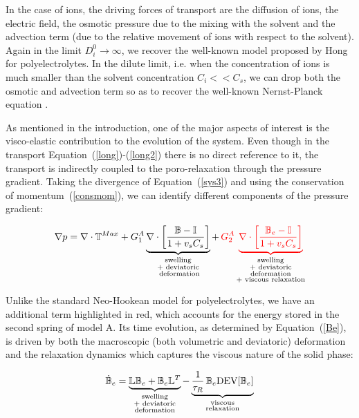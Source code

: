 In the case of ions, the driving forces of transport are the diffusion of ions, the electric field, the osmotic pressure due to the mixing with the solvent and the advection term (due to the relative movement of ions with respect to the solvent). Again in the limit $D^0_i\rightarrow\infty$, we recover the well-known model proposed by Hong \cite{Reviewpolyel} for polyelectrolytes. In the dilute limit, i.e. when the concentration of ions is much smaller than the solvent  concentration $C_i<<C_s$, we can drop both the osmotic and advection term so as to recover the well-known Nernst-Planck equation \cite[see Equation (6.67)]{Reviewpolyel}.

As mentioned in the introduction, one of the major aspects of interest is the visco-elastic contribution to the evolution of the system. Even though in the transport Equation~(\ref{long})-(\ref{long2}) there is no direct reference to it, the transport is indirectly coupled to the poro-relaxation through the pressure gradient. Taking the divergence of Equation~(\ref{sys3}) and using the conservation of momentum~(\ref{consmom}), we can identify different components of the pressure gradient:

\begin{equation}
\nabla p= \nabla \cdot \mathbb{T}^{Max} + G_1^A\underbrace{ \nabla \cdot \left[\frac{\mathbb{B}-\mathbb{I}}{1+v_sC_s}\right]}_{\substack{\text{swelling}\\\text{+ deviatoric}\\\text{ deformation}}} + \,\color{red} G_2^A \underbrace{\nabla \cdot\left[\frac{\mathbb{B}_e-\mathbb{I}}{1+v_sC_s}\right]}_{\color{black}\substack{\text{swelling}\\\text{+ deviatoric}\\\text{deformation}\\\text{+ viscous relaxation}}}\color{black}
\end{equation}

Unlike the standard Neo-Hookean model for polyelectrolytes, we have an additional term highlighted in red, which accounts for the energy stored in the second spring of model A. Its time evolution, as determined by Equation~(\ref{Be}), is driven by both the macroscopic (both volumetric and deviatoric) deformation and the relaxation dynamics which captures the viscous nature of the solid phase:

\begin{equation}
\dot{\mathbb{B}}_e=\underbrace{\mathbb{L}\mathbb{B}_e + \mathbb{B}_e \mathbb{L}^T}_{\substack{\text{swelling}\\\text{+ deviatoric}\\\text{deformation}}} - \underbrace{\frac{1}{\tau_R} \,\mathbb{B}_e\text{DEV}[\mathbb{B}_e]}_{\substack{\text{viscous}\\\text{relaxation}}}\label{Be2}
\end{equation}


